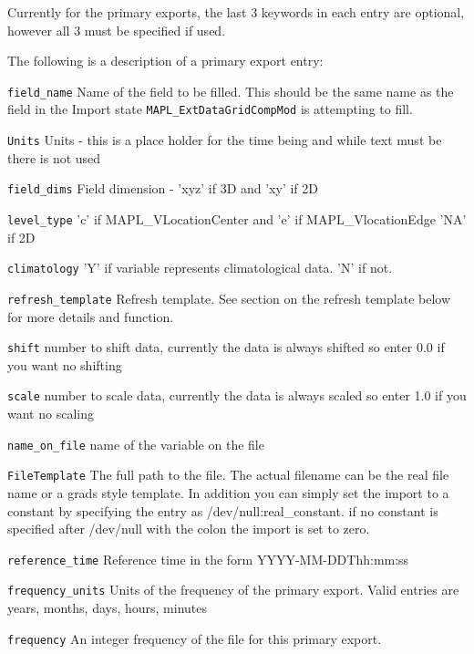 Currently for the primary exports, the last 3 keywords in each entry are optional, however all 3 must be specified if used.

The following is a description of a primary export entry:
\begin{trivlist}
\item[\tt field\_name]        Name of the field to be filled. This should be the same 
                              name as the field in the Import state {\tt MAPL\_ExtDataGridCompMod}
                              is attempting to fill.
\item[\tt Units]              Units - this is a place holder for the time being and while text must
                              be there is not used
\item[\tt field\_dims]        Field dimension - 'xyz' if 3D and 'xy' if 2D
\item[\tt level\_type]        'c' if MAPL\_VLocationCenter and 'e' if MAPL\_VlocationEdge 'NA' if 2D
\item[\tt climatology]        'Y' if variable represents climatological data. 'N' if not.
\item[\tt refresh\_template]  Refresh template. See section on the refresh template below for more details and function.
\item[\tt shift]              number to shift data, currently the data is always shifted so enter 0.0 if you want no shifting
\item[\tt scale]              number to scale data, currently the data is always scaled so enter 1.0 if you want no scaling
\item[\tt name\_on\_file]     name of the variable on the file
\item[\tt FileTemplate]       The full path to the file. The actual filename can be the real file name or a grads
                              style template. In addition you can simply set the import to a constant by specifying the 
                              entry as /dev/null:real\_constant. if no constant is specified after /dev/null with the colon
                              the import is set to zero.
\item[\tt reference\_time]    Reference time in the form YYYY-MM-DDThh:mm:ss
\item[\tt frequency\_units]   Units of the frequency of the primary export. Valid entries are years, months, days, hours, minutes
\item[\tt frequency]          An integer frequency of the file for this primary export.
\end{trivlist}

